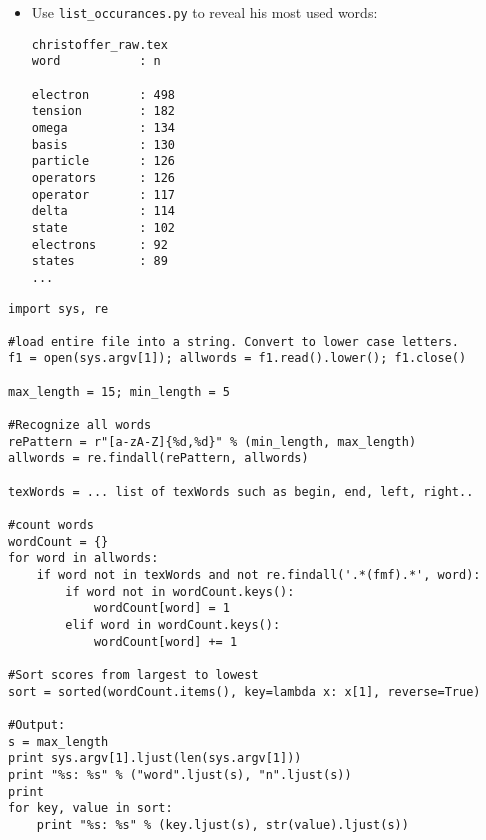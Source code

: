\documentclass{beamer}
\begin{document}
\begin{frame}[containsverbatim]
\begin{itemize}

\item Use \verb+list_occurances.py+ to reveal his most used words:
 
\vspace{0.2cm}
\scriptsize
\begin{verbatim}
christoffer_raw.tex           
word           : n              

electron       : 498            
tension        : 182            
omega          : 134            
basis          : 130            
particle       : 126            
operators      : 126            
operator       : 117            
delta          : 114            
state          : 102            
electrons      : 92             
states         : 89    
...
\end{verbatim}
\normalsize
\end{itemize}
\end{frame}

\begin{frame}[containsverbatim]
\tiny
\begin{verbatim}
import sys, re

#load entire file into a string. Convert to lower case letters.
f1 = open(sys.argv[1]); allwords = f1.read().lower(); f1.close()

max_length = 15; min_length = 5

#Recognize all words
rePattern = r"[a-zA-Z]{%d,%d}" % (min_length, max_length)
allwords = re.findall(rePattern, allwords)

texWords = ... list of texWords such as begin, end, left, right..

#count words
wordCount = {}
for word in allwords:
    if word not in texWords and not re.findall('.*(fmf).*', word):
        if word not in wordCount.keys():
            wordCount[word] = 1
        elif word in wordCount.keys():
            wordCount[word] += 1

#Sort scores from largest to lowest
sort = sorted(wordCount.items(), key=lambda x: x[1], reverse=True)

#Output:
s = max_length
print sys.argv[1].ljust(len(sys.argv[1]))
print "%s: %s" % ("word".ljust(s), "n".ljust(s))     
print
for key, value in sort:
    print "%s: %s" % (key.ljust(s), str(value).ljust(s))
\end{verbatim}
\normalsize
\end{frame}
\end{document}
